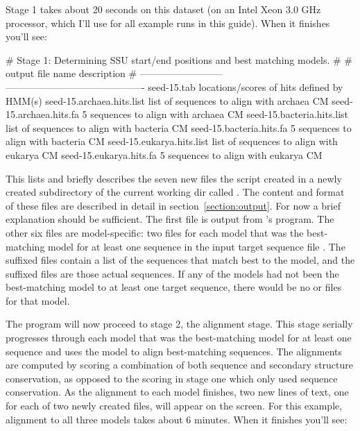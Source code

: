 Stage 1 takes about 20 seconds on this dataset (on an Intel Xeon 3.0
GHz processor, which I'll use for all example runs in this
guide). When it finishes you'll see: 

\begin{sreoutput}
# Stage 1: Determining SSU start/end positions and best matching models.
#
# output file name            description                                
# --------------------------  -------------------------------------------
  seed-15.tab                 locations/scores of hits defined by HMM(s)
  seed-15.archaea.hits.list   list of sequences to align with archaea CM
  seed-15.archaea.hits.fa           5 sequences to align with archaea CM
  seed-15.bacteria.hits.list  list of sequences to align with bacteria CM
  seed-15.bacteria.hits.fa          5 sequences to align with bacteria CM
  seed-15.eukarya.hits.list   list of sequences to align with eukarya CM
  seed-15.eukarya.hits.fa           5 sequences to align with eukarya CM
\end{sreoutput}

This lists and briefly describes the seven new files the script created
in a newly created subdirectory of the current working dir called
. The content and format of these files are described
in detail in section~\ref{section:output}. For now a brief explanation
should be sufficient. The first file  is output from
's  program. The other six files are
model-specific: two files for each model that was the best-matching
model for at least one sequence in the input target sequence file
. The  suffixed files contain a list
of the sequences that match best to the model, and the 
suffixed files are those actual sequences. If any of the models had
not been the best-matching model to at least one target sequence,
there would be no  or  files for that
model.

The program will now proceed to stage 2, the alignment stage. This
stage serially progresses through each model that was the
best-matching model for at least one sequence and uses the model to
align best-matching sequences. The alignments are computed by scoring
a combination of both sequence and secondary structure conservation,
as opposed to the scoring in stage one which only used sequence
conservation. As the alignment to each model finishes, two new lines
of text, one for each of two newly created files, will appear on the
screen. For this example, alignment to all three models takes about 6
minutes. When it finishes you'll see:

